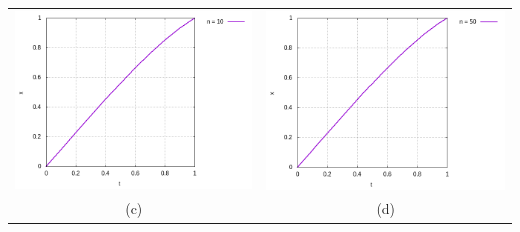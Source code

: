 \documentclass[12pt]{article}
\begin{document}
\begin{center}
\begin{tabular}{cc}
                \includegraphics[scale=0.5]{Plots/plot_n_10.png} & \includegraphics[scale=0.5]{Plots/plot_n_50.png}\\
                (c) & (d)\\

\end{tabular}
\end{center}
\end{document}
